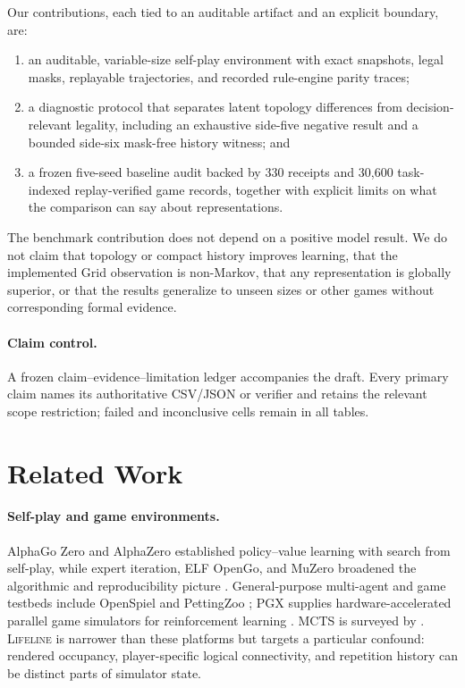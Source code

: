 \documentclass[10pt,letterpaper]{article}
\newcommand{\lifeline}{\textsc{Lifeline}}
\begin{document}
Our contributions, each tied to an auditable artifact and an explicit boundary,
are:
\begin{enumerate}
  \item an auditable, variable-size self-play environment with exact
  snapshots, legal masks, replayable trajectories, and recorded rule-engine
  parity traces;
  \item a diagnostic protocol that separates latent topology differences from
  decision-relevant legality, including an exhaustive side-five negative
  result and a bounded side-six mask-free history witness; and
  \item a frozen five-seed baseline audit backed by 330 receipts and 30,600
  task-indexed replay-verified game records, together with explicit limits on
  what the comparison can say about representations.
\end{enumerate}

The benchmark contribution does not depend on a positive model result. We do
not claim that topology or compact history improves learning, that the
implemented Grid observation is non-Markov, that any representation is
globally superior, or that the results generalize to unseen sizes or other
games without corresponding formal evidence.

\paragraph{Claim control.}
A frozen claim--evidence--limitation ledger accompanies the draft. Every primary
claim names its authoritative CSV/JSON or verifier and retains the relevant
scope restriction; failed and inconclusive cells remain in all tables.

\section{Related Work}
\label{sec:related}

\paragraph{Self-play and game environments.}
AlphaGo Zero and AlphaZero established policy--value learning with search from
self-play, while expert iteration, ELF OpenGo, and MuZero broadened the
algorithmic and reproducibility picture
\citep{silver2017mastering,silver2018general,anthony2017thinking,
tian2019elf,schrittwieser2020mastering}. General-purpose multi-agent and game
testbeds include OpenSpiel and PettingZoo
\citep{lanctot2019openspiel,terry2020pettingzoo}; PGX supplies
hardware-accelerated parallel game simulators for reinforcement learning
\citep{koyamada2023pgx}. MCTS is surveyed by \citet{browne2012survey}.
\lifeline{} is narrower than these platforms but
targets a particular confound: rendered occupancy, player-specific logical
connectivity, and repetition history can be distinct parts of simulator state.
\end{document}

